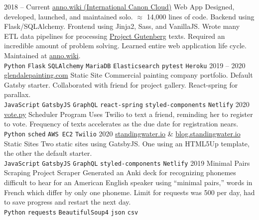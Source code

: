 \documentclass[9pt]{developercv} %
\begin{document}
\begin{entrylist}
	\entry
		{2018 -- Current}
        {{\href{https://github.com/malan88/icc}{anno.wiki (International Canon Cloud)}}}
		{Web App}
        {Designed, developed, launched, and maintained solo. $\approx$ 14,000
        lines of code. Backend using Flask/SQLAlchemy. Frontend using Jinja2,
        Sass, and VanillaJS. Wrote many ETL data pipelines for processing
        {\href{https://gutenberg.org}{Project Gutenberg}} texts. Required an
        incredible amount of problem solving. Learned entire web application
        life cycle. Maintained at {\href{https://anno.wiki}{anno.wiki}}.
        \\
        \texttt{Python}\slashsep
        \texttt{Flask}\slashsep
        \texttt{SQLAlchemy}\slashsep
        \texttt{MariaDB}\slashsep
        \texttt{Elasticsearch}\slashsep
        \texttt{pytest}\slashsep
        \texttt{Heroku}
        }
	\entry
		{2019 -- 2020}
        {{\href{https://glendalepainting.netlify.app}{glendalepainting.com}}}
		{Static Site}
        {Commercial painting company portfolio. Default Gatsby starter.
        Collaborated with friend for project gallery. React-spring for parallax.
        \\
        \texttt{JavaScript}\slashsep
        \texttt{GatsbyJS}\slashsep
        \texttt{GraphQL}\slashsep
        \texttt{react-spring}\slashsep
        \texttt{styled-components}\slashsep
        \texttt{Netlify}
        }
	\entry
		{2020}
        {\href{https://github.com/malan88/vote}{vote.py}}
		{Scheduler Program}
        {Uses Twilio to text a friend, reminding her to register to vote.
        Frequency of texts accelerates as the due date for registration nears.
        \\
        \texttt{Python}\slashsep
        \texttt{sched}\slashsep
        \texttt{AWS EC2}\slashsep
        \texttt{Twilio}
        }
    \entry
        {2020}
        {
            {\href{https://standingwater.io}{standingwater.io}}
            \& {\href{https://blog.standingwater.io}{blog.standingwater.io}}
        }
        {Static Sites}
        {Two static sites using GatsbyJS. One using an HTML5Up
        template, the other the default starter.
        \\
        \texttt{JavaScript}\slashsep
        \texttt{GatsbyJS}\slashsep
        \texttt{GraphQL}\slashsep
        \texttt{styled-components}\slashsep
        \texttt{Netlify}
        }
	\entry
		{2019}
		{Minimal Pairs Scraping Project}
		{Scraper}
        {Generated an Anki deck for recognizing phonemes difficult to hear for
        an American English speaker using “minimal pairs,” words in French which
        differ by only one phoneme. Limit for requests was 500 per day, had to
        save progress and restart the next day.
        \\
        \texttt{Python}\slashsep
        \texttt{requests}\slashsep
        \texttt{BeautifulSoup4}\slashsep
        \texttt{json}\slashsep
        \texttt{csv}
        }
\end{entrylist}
\end{document}
